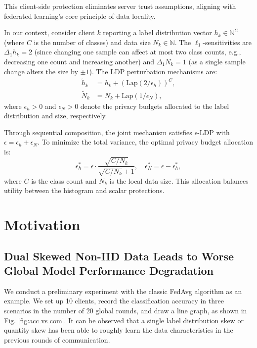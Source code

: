 \documentclass[journal,twoside,web]{ieeecolor}
\begin{document}
This client-side protection eliminates server trust assumptions, aligning with federated learning's core principle of data locality.

In our context, consider client \(k\) reporting a label distribution vector \(h_k \in \mathbb{N}^C\) (where \(C\) is the number of classes) and data size \(N_k \in \mathbb{N}\). The \(\ell_1\)-sensitivities are \(\Delta_1 h_k = 2\) (since changing one sample can affect at most two class counts, e.g., decreasing one count and increasing another) and \(\Delta_1 N_k = 1\) (as a single sample change alters the size by \(\pm 1\)). The LDP perturbation mechanisms are:
\begin{align}
\tilde{h}_k &= h_k + \left(\text{Lap}\left(2 / \epsilon_h\right)\right)^C, \label{eq:ldp_label} \\
\tilde{N}_k &= N_k + \text{Lap}\left(1 / \epsilon_N\right), \label{eq:ldp_size}
\end{align}
where \(\epsilon_h > 0\) and \(\epsilon_N > 0\) denote the privacy budgets allocated to the label distribution and size, respectively.

Through sequential composition, the joint mechanism satisfies \(\epsilon\)-LDP with \(\epsilon = \epsilon_h + \epsilon_N\). To minimize the total variance, the optimal privacy budget allocation is:
\begin{equation}
\epsilon_h^* = \epsilon \cdot \frac{\sqrt{C / N_k}}{\sqrt{C / N_k} + 1}, \quad \epsilon_N^* = \epsilon - \epsilon_h^*, \label{eq:opt_alloc}
\end{equation}
where \(C\) is the class count and \(N_k\) is the local data size. This allocation balances utility between the histogram and scalar protections.



\section{Motivation}
\subsection{Dual Skewed Non-IID Data Leads to Worse Global Model Performance Degradation}
We conduct a preliminary experiment with the classic FedAvg algorithm as an example. We set up 10 clients, record the classification accuracy in three scenarios in the number of 20 global rounds, and draw a line graph, as shown in Fig. \ref{fig:acc vs com}.
It can be observed that a single label distribution skew or quantity skew has been able to roughly learn the data characteristics in the previous rounds of communication. 
\end{document}
